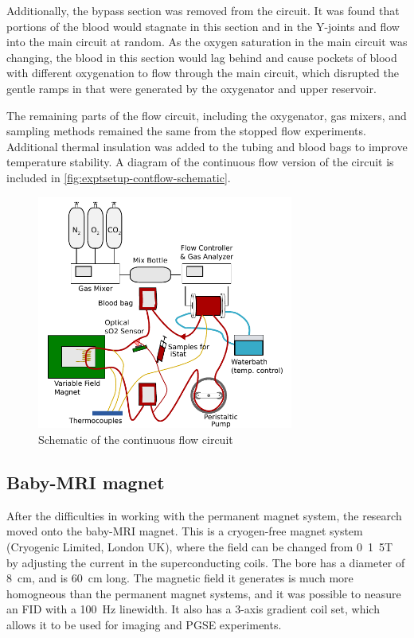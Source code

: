 Additionally, the bypass section was removed from the circuit.
It was found that portions of the blood would stagnate in this section and in the Y-joints and flow into the main circuit at random.
As the oxygen saturation in the main circuit was changing, the blood in this section would lag behind and cause pockets of blood with different oxygenation to flow through the main circuit, which disrupted the gentle ramps in \SOtwo that were generated by the oxygenator and upper reservoir.

The remaining parts of the flow circuit, including the oxygenator, gas mixers, and sampling methods remained the same from the stopped flow experiments.
Additional thermal insulation was added to the tubing and blood bags to improve temperature stability.
A diagram of the continuous flow version of the circuit is included in \autoref{fig:exptsetup-contflow-schematic}.

\begin{figure}[t]
\centering
\includegraphics[width=0.75\textwidth]{figures/exptsetup/contflowschematic.pdf}
\caption{Schematic of the continuous flow circuit}
\label{fig:exptsetup-contflow-schematic}
\end{figure}

\subsection{Baby-MRI magnet}
After the difficulties in working with the permanent magnet system, the research moved onto the baby-MRI magnet.
This is a cryogen-free magnet system (Cryogenic Limited, London UK), where the field can be changed from \SI{0}{1.5}{T} by adjusting the current in the superconducting coils.
The bore has a diameter of \SI{8}{cm}, and is \SI{60}{cm} long.
The magnetic field it generates is much more homogneous than the permanent magnet systems, and it was possible to neasure an FID with a \SI{100}{Hz} linewidth.
It also has a 3-axis gradient coil set, which allows it to be used for imaging and PGSE experiments.

